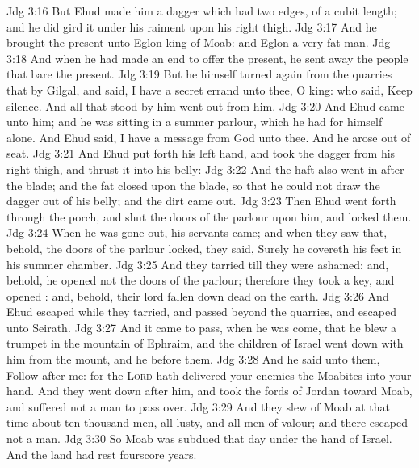 \vs Jdg 3:16 But Ehud made him a dagger which had two edges, of a cubit length; and he did gird it under his raiment upon his right thigh.
\vs Jdg 3:17 And he brought the present unto Eglon king of Moab: and Eglon  a very fat man.
\vs Jdg 3:18 And when he had made an end to offer the present, he sent away the people that bare the present.
\vs Jdg 3:19 But he himself turned again from the quarries that  by Gilgal, and said, I have a secret errand unto thee, O king: who said, Keep silence. And all that stood by him went out from him.
\vs Jdg 3:20 And Ehud came unto him; and he was sitting in a summer parlour, which he had for himself alone. And Ehud said, I have a message from God unto thee. And he arose out of  seat.
\vs Jdg 3:21 And Ehud put forth his left hand, and took the dagger from his right thigh, and thrust it into his belly:
\vs Jdg 3:22 And the haft also went in after the blade; and the fat closed upon the blade, so that he could not draw the dagger out of his belly; and the dirt came out.
\vs Jdg 3:23 Then Ehud went forth through the porch, and shut the doors of the parlour upon him, and locked them.
\vs Jdg 3:24 When he was gone out, his servants came; and when they saw that, behold, the doors of the parlour  locked, they said, Surely he covereth his feet in his summer chamber.
\vs Jdg 3:25 And they tarried till they were ashamed: and, behold, he opened not the doors of the parlour; therefore they took a key, and opened : and, behold, their lord  fallen down dead on the earth.
\vs Jdg 3:26 And Ehud escaped while they tarried, and passed beyond the quarries, and escaped unto Seirath.
\vs Jdg 3:27 And it came to pass, when he was come, that he blew a trumpet in the mountain of Ephraim, and the children of Israel went down with him from the mount, and he before them.
\vs Jdg 3:28 And he said unto them, Follow after me: for the \textsc{Lord} hath delivered your enemies the Moabites into your hand. And they went down after him, and took the fords of Jordan toward Moab, and suffered not a man to pass over.
\vs Jdg 3:29 And they slew of Moab at that time about ten thousand men, all lusty, and all men of valour; and there escaped not a man.
\vs Jdg 3:30 So Moab was subdued that day under the hand of Israel. And the land had rest fourscore years.
